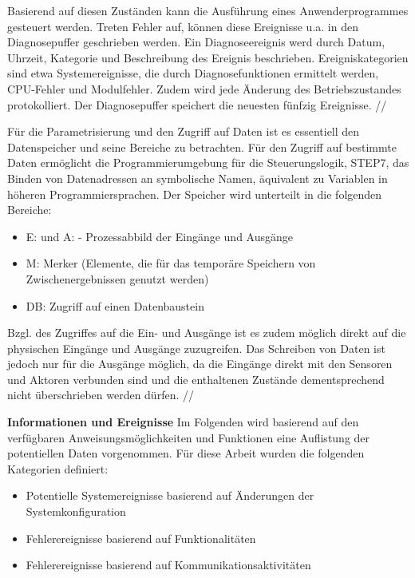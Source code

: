 Basierend auf diesen Zuständen kann die Ausführung eines Anwenderprogrammes gesteuert werden. Treten Fehler auf, können diese Ereignisse u.a. in den Diagnosepuffer geschrieben werden. Ein Diagnoseereignis werd durch Datum, Uhrzeit, Kategorie und Beschreibung des Ereignis beschrieben. Ereigniskategorien sind etwa Systemereignisse, die durch Diagnosefunktionen ermittelt werden, CPU-Fehler und Modulfehler. Zudem wird jede Änderung des Betriebszustandes protokolliert. Der Diagnosepuffer speichert die neuesten fünfzig Ereignisse. //

Für die Parametrisierung und den Zugriff auf Daten ist es essentiell den Datenspeicher und seine Bereiche zu betrachten. Für den Zugriff auf bestimmte Daten ermöglicht die Programmierumgebung für die Steuerungslogik, \glqq STEP7\grqq , das Binden von Datenadressen an symbolische Namen, äquivalent zu Variablen in höheren Programmiersprachen. Der Speicher wird unterteilt in die folgenden Bereiche:
\begin{itemize}
\item E: und A: - Prozessabbild der Eingänge und Ausgänge
\item M: Merker (Elemente, die für das temporäre Speichern von Zwischenergebnissen genutzt werden)
\item DB: Zugriff auf einen Datenbaustein
\end{itemize}

Bzgl. des Zugriffes auf die Ein- und Ausgänge ist es zudem möglich direkt auf die physischen Eingänge und Ausgänge zuzugreifen. Das Schreiben von Daten ist jedoch nur für die Ausgänge möglich, da die Eingänge direkt mit den Sensoren und Aktoren verbunden sind und die enthaltenen Zustände dementsprechend nicht überschrieben werden dürfen.  //

\textbf{Informationen und Ereignisse}
Im Folgenden wird basierend auf den verfügbaren Anweisungsmöglichkeiten und Funktionen eine Auflistung der potentiellen Daten vorgenommen. Für diese Arbeit wurden die folgenden Kategorien definiert:
\begin{itemize}
\item Potentielle Systemereignisse basierend auf Änderungen der Systemkonfiguration
\item Fehlerereignisse basierend auf Funktionalitäten
\item Fehlerereignisse basierend auf Kommunikationsaktivitäten
\end{itemize}


